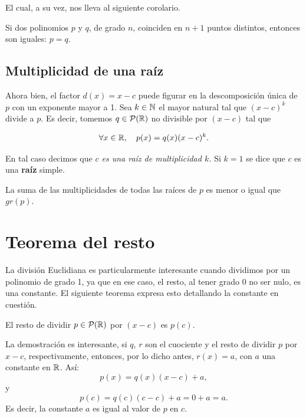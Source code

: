 El cual, a su vez, nos lleva al siguiente corolario.

\medskip

\begin{cor}
Si dos polinomios $p$ y $q$, de grado $n$, coinciden en $n+1$ puntos distintos, entonces son iguales: $p=q$. 
\end{cor}



\subsection{Multiplicidad de una raíz}

Ahora bien, el factor $d(x)=x-c$ puede figurar en la descomposición única de $p$ con un exponente mayor a 1.
Sea $k\in \mathbb{N}$ el mayor natural tal que $(x-c)^k$ divide a $p$.
Es decir, tomemos $q \in \mathcal{P}(\mathbb{R})$ no divisible por $(x-c)$ tal que 

\vspace{-.3cm}

$$\forall x\in \mathbb{R}, \quad p(x)=q(x)(x-c)^k.$$

\vspace{-.1cm}

En tal caso decimos que \emph{$c$ es una ra\'iz de multiplicidad $k$.}
Si $k=1$ se dice que $c$ es una {\bf ra\'iz} simple.

\medskip

\begin{rem}
La suma de las multiplicidades de todas las ra\'ices de $p$ es menor o igual que $gr(p)$.
\end{rem}


\section{Teorema del resto}

La división Euclidiana es particularmente interesante cuando dividimos por un polinomio de grado 1, ya que en ese caso, el resto, al tener grado 0 no ser nulo, es una constante. 
El siguiente teorema expresa esto detallando la constante en cuestión.

\medskip

\begin{thm}
El resto de dividir  $p \in \mathcal{P}(\mathbb{R})$ por  $(x-c)$ es $p(c)$.
\end{thm}

La demostración es interesante, si $q$, $r$ son el cuociente y el resto de dividir $p$ por $x-c$, respectivamente, entonces, por lo dicho antes, $r(x)=a$, con $a$ una constante en $\mathbb{R}$.
Así:
$$ p(x)=q(x)(x-c)+a,$$
y
$$ p(c)=q(c)(c-c)+a=0+a=a.$$
Es decir, la constante $a$ es igual al valor de $p$ en $c$.


